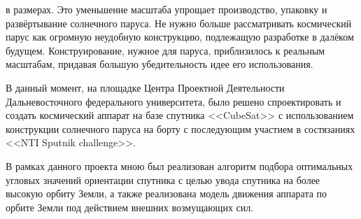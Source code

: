 в размерах. Это уменьшение масштаба упрощает производство, упаковку и
развёртывание солнечного паруса. Не нужно больше рассматривать космический
парус как огромную неудобную конструкцию, подлежащую разработке в далёком будущем.
Конструирование, нужное для паруса, приблизилось к реальным масштабам, придавая
большую убедительность идее его использования.\par
    В данный момент, на площадке Центра Проектной Деятельности Дальневосточного
федерального университета, было решено спроектировать и создать космический аппарат
на базе спутника <<CubeSat>> с использованием конструкции солнечного паруса на борту
с последующим участием в состязаниях <<NTI Sputnik challenge>>.\par
    В рамках данного проекта мною был реализован алгоритм подбора оптимальных
угловых значений ориентации спутника с целью увода спутника на более высокую орбиту
Земли, а также реализована модель движения аппарата по орбите Земли под действием
внешних возмущающих сил.
